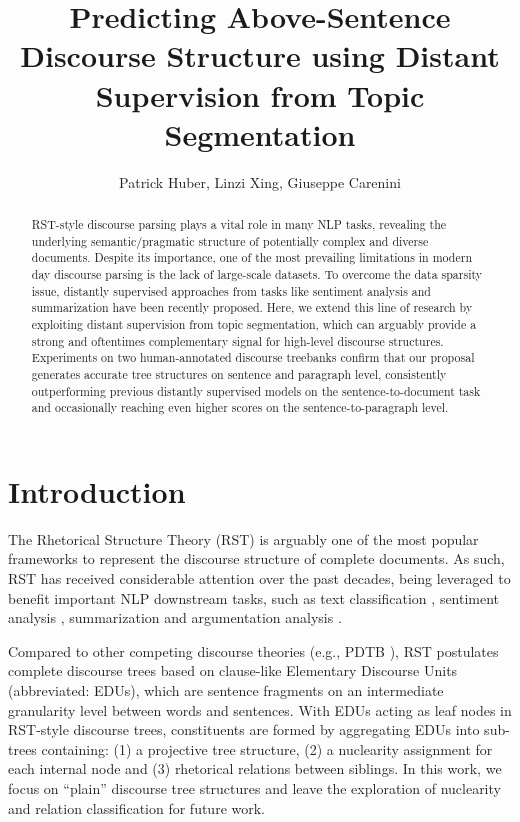 \documentclass[letterpaper]{article} %
\title{Predicting Above-Sentence Discourse Structure using Distant Supervision from Topic Segmentation}
\author{
    Patrick Huber\equalcontrib,
    Linzi Xing\equalcontrib,
    Giuseppe Carenini
}
\begin{document}
\maketitle

\begin{abstract}
RST-style discourse parsing plays a vital role in many NLP tasks, revealing the underlying semantic/pragmatic structure of potentially complex and diverse documents. Despite its importance, one of the most prevailing limitations in modern day discourse parsing is the lack of large-scale datasets. To overcome the data sparsity issue, distantly supervised approaches from tasks like sentiment analysis and summarization have been recently proposed. Here, we extend this line of research by exploiting distant supervision from topic segmentation, which can arguably provide a strong and oftentimes complementary signal for high-level discourse structures. Experiments on two human-annotated discourse treebanks confirm that our proposal generates accurate tree structures on sentence and paragraph level, consistently outperforming previous distantly supervised models on the sentence-to-document task and occasionally reaching even higher scores on the sentence-to-paragraph level.
\end{abstract}

\section{Introduction}
The Rhetorical Structure Theory (RST) \cite{mann1988rhetorical} is arguably one of the most popular frameworks to represent the 
discourse structure of complete documents. As such, RST has received considerable attention over the past decades, being leveraged to benefit important NLP downstream tasks, such as text classification \cite{ji-smith-2017-neural}, sentiment analysis \cite{bhatia-etal-2015-better, hogenboom2015using,  nejat-etal-2017-exploring, huber-carenini-2020-sentiment}, summarization \cite{Marcu1999, gerani-etal-2014-abstractive, xu-etal-2020-discourse, xiao-etal-2020-really} and argumentation analysis \cite{chakrabarty-etal-2019-ampersand}.

Compared to other competing discourse theories (e.g., PDTB \cite{prasad-etal-2008-penn}), RST postulates complete discourse trees based on clause-like Elementary Discourse Units (abbreviated: EDUs), which are sentence fragments on an intermediate granularity level between words and sentences. With EDUs acting as leaf nodes in RST-style discourse trees, constituents are formed by aggregating EDUs into sub-trees containing:
(1) a projective tree structure, (2) a nuclearity assignment for each internal node and (3) rhetorical relations between siblings. In this work, we focus on ``plain'' discourse tree structures and leave the exploration of nuclearity and relation classification for future work.
\end{document}
